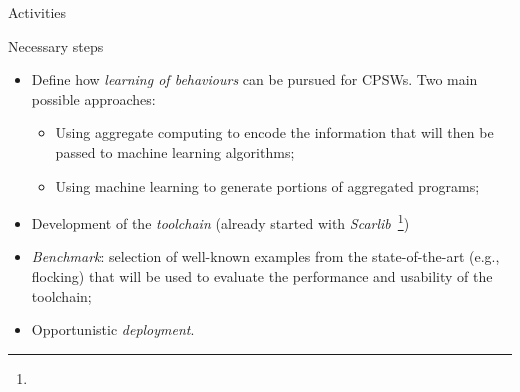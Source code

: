 \documentclass[presentation]{beamer}\mode<presentation>{\usetheme{AMSBolognaFC}}
\begin{document}
\begin{frame}[c]{Activities}

\begin{block}{Necessary steps}
	\begin{itemize}
		\item Define how \emph{learning of behaviours} can be pursued for CPSWs. 
			Two main possible approaches:
			\begin{itemize}
				\item Using aggregate computing to encode the information that will then be 
					passed to machine learning algorithms;
				\item Using machine learning to generate portions of aggregated programs;
			\end{itemize}
		\item Development of the \emph{toolchain} (already started with \emph{Scarlib}~\footnote{})%
		\item \emph{Benchmark}: selection of well-known examples from the state-of-the-art (e.g., flocking) 
			that will be used to evaluate the performance and usability of the toolchain;
		\item Opportunistic \emph{deployment}.
	\end{itemize}
\end{block}
	
\end{frame}


\end{document}
